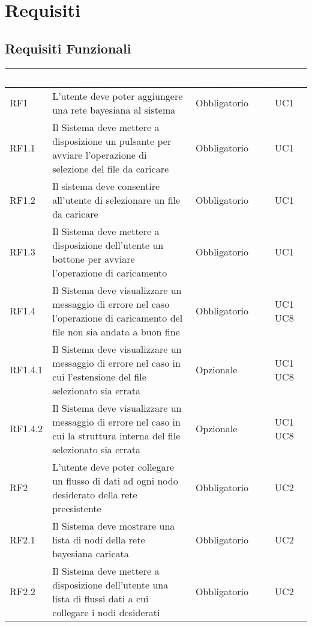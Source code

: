 \section{Requisiti}\label{Requisiti}

\subsection{Requisiti Funzionali}\label{RF}
\begin{center}
\begin{longtable}[c]{|m{}|m{}|m{}|m{}|}
\hline
\rowcolor{bluelogo}\textbf{\textcolor{white}{ID}} & \textbf{\textcolor{white}{Descrizione}} & \textbf{\textcolor{white}{Obbligatorietà}} & \textbf{\textcolor{white}{Fonti}}\\
\hline \hline
\endhead
RF1 & L'utente deve poter aggiungere una rete bayesiana al sistema & Obbligatorio & UC1\\
\hline
\rowcolor{grigio}RF1.1 & Il Sistema deve mettere a disposizione un pulsante per avviare l'operazione di selezione del file da caricare & Obbligatorio & UC1\\
\hline
RF1.2 & Il sistema deve consentire all'utente di selezionare un file da caricare & Obbligatorio & UC1\\
\hline
\rowcolor{grigio}RF1.3 & Il Sistema deve mettere a disposizione dell'utente un bottone per avviare l'operazione di caricamento & Obbligatorio & UC1\\
\hline
RF1.4 & Il Sistema deve visualizzare un messaggio di errore nel caso l'operazione di caricamento del file non sia andata a buon fine & Obbligatorio & UC1 UC8\\
\hline
\rowcolor{grigio}RF1.4.1 & Il Sistema deve visualizzare un messaggio di errore nel caso in cui l'estensione del file selezionato sia errata & Opzionale & UC1 UC8\\
\hline
RF1.4.2 & Il Sistema deve visualizzare un messaggio di errore nel caso in cui la struttura interna del file selezionato sia errata & Opzionale & UC1 UC8\\
\hline
\rowcolor{grigio}RF2 & L'utente deve poter collegare un flusso di dati ad ogni nodo desiderato della rete preesistente & Obbligatorio & UC2\\
\hline
RF2.1 & Il Sistema deve mostrare una lista di nodi della rete bayesiana caricata & Obbligatorio & UC2\\
\hline
\rowcolor{grigio}RF2.2 & Il Sistema deve mettere a disposizione dell'utente una lista di flussi dati a cui collegare i nodi desiderati & Obbligatorio & UC2\\

\end{longtable}
\end{center}

